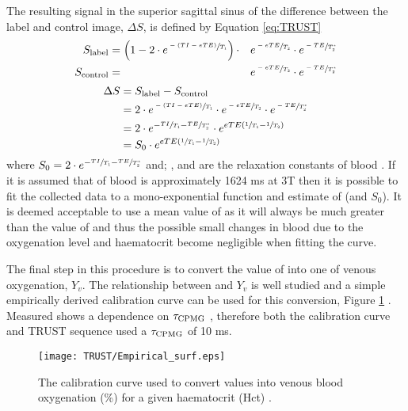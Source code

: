 The resulting signal in the superior sagittal sinus of the difference between the label and control image, $\Delta S$, is defined by Equation \eqref{eq:TRUST}
\begin{alignat}{2}
	S_{\text{label}} &=\left(1-2\cdot e^{\sfrac{-\left(TI - eTE\right)}{T_1}}\right) \cdot & &e^{\sfrac{-eTE}{T_2}} \cdot e^{\sfrac{-TE}{T_2^*}} \\
	S_{\text{control}} &= & &e^{\sfrac{-eTE}{T_2}} \cdot e^{\sfrac{-TE}{T_2^*}} 
\end{alignat}  
\begin{alignat}{1}
	\Delta S&=S_{\text{label}}-S_{\text{control}}\nonumber\\
	&= 2\cdot e^{\sfrac{-\left(TI - eTE\right)}{T_1}} \cdot e^{\sfrac{-eTE}{T_2}} \cdot e^{\sfrac{-TE}{T_2^*}} \nonumber\\
	&= 2 \cdot e^{-\sfrac{TI}{T_1}-\sfrac{TE}{T_2^*}} \cdot e^{eTE\left(\sfrac{1}{T_1}-\sfrac{1}{T_2}\right)}\nonumber\\
	&=S_0 \cdot e^{eTE\left(\sfrac{1}{T_1}-\sfrac{1}{T_2}\right)}
	\label{eq:TRUST}
\end{alignat}  
where $S_0=2 \cdot e^{-\sfrac{TI}{T_1}-\sfrac{TE}{T_2^*}}$ and; \tone, \ttwo and \ttwostar are the relaxation constants of blood \cite{lu_quantitative_2008}. If it is assumed that \tone of blood is approximately 1624 ms at 3T \cite{lu_determining_2004} then it is possible to fit the collected data to a mono-exponential function and estimate of \ttwo (and $S_0$). It is deemed acceptable to use a mean value of \tone as it will always be much greater than the value of \ttwo and thus the possible small changes in blood \tone due to the oxygenation level and haematocrit become negligible when fitting the \ttwo curve.

The final step in this procedure is to convert the value of \ttwo into one of venous oxygenation, $Y_v$. The relationship between \ttwo and $Y_v$ is well studied and a simple empirically derived calibration curve can be used for this conversion, Figure \ref{fig:calibration_curve} \cite{silvennoinen_comparison_2003, liu_t1_2016}. Measured \ttwo shows a dependence on $\tau_{\textup{CPMG}}$ \cite{gardener_dependence_2010}, therefore both the calibration curve and \ac{TRUST} sequence used a $\tau_{\textup{CPMG}}$ of 10 ms.

\begin{figure}[H]
	\centering
	\texttt{[image: TRUST/Empirical\_surf.eps]}
	\caption{The calibration curve used to convert \ttwo values into venous blood oxygenation (\%) for a given haematocrit (Hct) \cite{lu_calibration_2012}.}
	\label{fig:calibration_curve}	
\end{figure}

